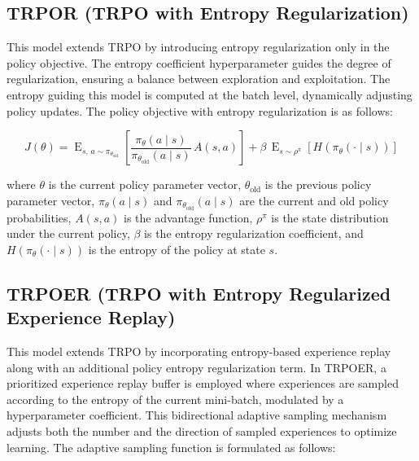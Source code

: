 \documentclass{svproc}
\begin{document}

\subsection{TRPOR (TRPO with Entropy Regularization)}

This model extends TRPO by introducing entropy regularization only in the policy objective. The entropy coefficient hyperparameter guides the degree of regularization, ensuring a balance between exploration and exploitation. The entropy guiding this model is computed at the batch level, dynamically adjusting policy updates. The policy objective with entropy regularization is as follows:

\begin{equation}
J(\theta) = \operatorname{E}_{s,\, a \sim \pi_{\theta_{\text{old}}}}
\left[
\frac{\pi_\theta(a \mid s)}{\pi_{\theta_{\text{old}}}(a \mid s)}\, A(s,a)
\right]
+ \beta\, \operatorname{E}_{s \sim \rho^\pi}
\left[
H\left(\pi_\theta(\cdot \mid s)\right)
\right]
\end{equation}

\noindent
where \(\theta\) is the current policy parameter vector, \(\theta_{\text{old}}\) is the previous policy parameter vector, \(\pi_\theta(a \mid s)\) and \(\pi_{\theta_{\text{old}}}(a \mid s)\) are the current and old policy probabilities, \(A(s,a)\) is the advantage function, \(\rho^\pi\) is the state distribution under the current policy, \(\beta\) is the entropy regularization coefficient, and \(H\left(\pi_\theta(\cdot \mid s)\right)\) is the entropy of the policy at state \(s\).



\subsection{TRPOER (TRPO with Entropy Regularized Experience Replay)}

This model extends TRPO by incorporating entropy-based experience replay along with an additional policy entropy regularization term. In TRPOER, a prioritized experience replay buffer is employed where experiences are sampled according to the entropy of the current mini-batch, modulated by a hyperparameter coefficient. This bidirectional adaptive sampling mechanism adjusts both the number and the direction of sampled experiences to optimize learning. The adaptive sampling function is formulated as follows:
\end{document}
